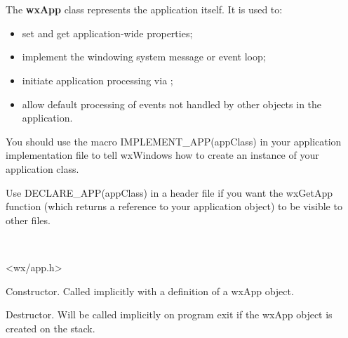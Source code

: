 \section{}\label{wxapp}

The {\bf wxApp} class represents the application itself. It is used
to:

\begin{itemize}\itemsep=0pt
\item set and get application-wide properties;
\item implement the windowing system message or event loop;
\item initiate application processing via ;
\item allow default processing of events not handled by other
objects in the application.
\end{itemize}

You should use the macro IMPLEMENT\_APP(appClass) in your application implementation
file to tell wxWindows how to create an instance of your application class.

Use DECLARE\_APP(appClass) in a header file if you want the wxGetApp function (which returns
a reference to your application object) to be visible to other files.


\\


<wx/app.h>






Constructor. Called implicitly with a definition of a wxApp object.



Destructor. Will be called implicitly on program exit if the wxApp
object is created on the stack.

\label{wxappargc}


